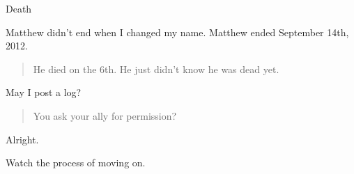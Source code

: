 Death

Matthew didn't end when I changed my name. Matthew ended September 14th, 2012.

\begin{quote}
He died on the 6th. He just didn't know he was dead yet.
\end{quote}

May I post a log?

\begin{quote}
You ask your ally for permission?
\end{quote}

Alright.

Watch the process of moving on.
